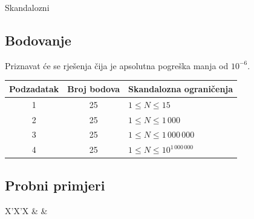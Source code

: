 \begin{statement}[
  problempoints=100,
  timelimit=1 sekunda,
  memorylimit=512 MiB,
]{Skandalozni}
\subsection*{Bodovanje}
Priznavat će se rješenja čija je apsolutna pogreška manja od $10^{-6}$.

{\renewcommand{\arraystretch}{1.4}
  \setlength{\tabcolsep}{6pt}
  \begin{tabular}{ccl}
 Podzadatak & Broj bodova & Skandalozna ograničenja \\ \midrule
  1 & 25 & $1 \le N \le 15$ \\
  2 & 25 & $1 \le N \le 1\,000$ \\
  3 & 25 & $1 \le N \le 1\,000\,000$ \\
  4 & 25 & $1 \le N \le 10^{1\,000\,000}$ \\
\end{tabular}}

\subsection*{Probni primjeri}
\begin{tabularx}{\textwidth}{X'X'X}
 &
 &
\end{tabularx}

\end{statement}

